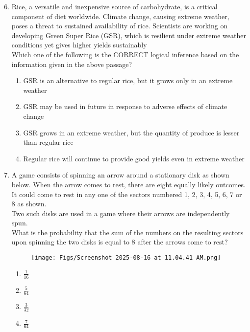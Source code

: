 \documentclass[12pt]{article}
\begin{document}
\begin{enumerate}
\setcounter{enumi}{5}

\item Rice, a versatile and inexpensive source of carbohydrate, is a critical component
of diet worldwide. Climate change, causing extreme weather, poses a threat to
sustained availability of rice. Scientists are working on developing Green Super
Rice (GSR), which is resilient under extreme weather conditions yet gives higher
yields sustainably \\

Which one of the following is the CORRECT logical inference based on the
information given in the above passage?



\begin{enumerate}
\item GSR is an alternative to regular rice, but it grows only in an extreme weather
\item GSR may be used in future in response to adverse effects of climate change
\item GSR grows in an extreme weather, but the quantity of produce is lesser than
regular rice
\item Regular rice will continue to provide good yields even in extreme weather
\end{enumerate}


\item A game consists of spinning an arrow around a stationary disk as shown below.
When the arrow comes to rest, there are eight equally likely outcomes. It could
come to rest in any one of the sectors numbered 1, 2, 3, 4, 5, 6, 7 or 8 as shown. \\

Two such disks are used in a game where their arrows are independently spun.\\ 

What is the probability that the sum of the numbers on the resulting sectors upon
spinning the two disks is equal to 8 after the arrows come to rest?

\begin{figure}[H]
\centering
\texttt{[image: Figs/Screenshot 2025-08-16 at 11.04.41 AM.png]}
\caption{}
\end{figure}




\begin{enumerate}
\item${\frac{1}{16}}$
\item${\frac{5}{64}}$
\item ${\frac{3}{32}}$
\item ${\frac{7}{64}}$
\end{enumerate}


\end{enumerate}
\end{document}
